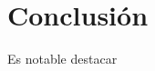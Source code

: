 \documentclass[%
    final,
    reprint,
    notitlepage,
    narroweqnarray,
    inline,
    twoside,
    invited
    ]{ieee}
\begin{document}
\section{Conclusión}

\PARstart Es notable destacar 

%
%
%
%
%











\clearpage

\end{document}
